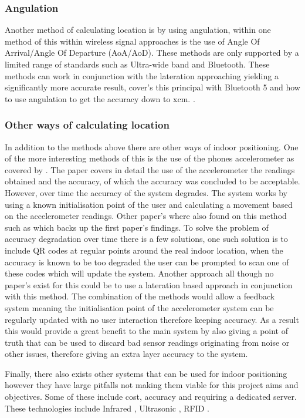 \subsubsection{Angulation}
Another method of calculating location is by using angulation, within one method of this within wireless signal approaches is the use of Angle Of Arrival/Angle Of Departure (AoA/AoD). These methods are only supported by a limited range of standards such as Ultra-wide band and Bluetooth. These methods can work in conjunction with the lateration approaching yielding a significantly more accurate result, \citetemp cover's this principal with Bluetooth 5 and how to use angulation to get the accuracy down to xcm. .

\subsubsection{Other ways of calculating location}
In addition to the methods above there are other ways of indoor positioning. One of the more interesting methods of this is the use of the phones accelerometer as covered by \citetemp. The paper covers in detail the use of the accelerometer the readings obtained and the accuracy, of which the accuracy was concluded to be acceptable. However, over time the accuracy of the system degrades. The system works by using a known initialisation point of the user and calculating a movement based on the accelerometer readings. Other paper's where also found on this method such as \citetemp which backs up the first paper's findings. To solve the problem of accuracy degradation over time there is a few solutions, one such solution is to include QR codes at regular points around the real indoor location, when the accuracy is known to be too degraded the user can be prompted to scan one of these codes which will update the system. Another approach all though no paper's exist for this could be to use a lateration based approach in conjunction with this method. The combination of the methods would allow a feedback system meaning the initialisation point of the accelerometer system can be regularly updated with no user interaction therefore keeping accuracy. As a result this would provide a great benefit to the main system by also giving a point of truth that can be used to discard bad sensor readings originating from noise or other issues, therefore giving an extra layer accuracy to the system.


Finally, there also exists other systems that can be used for indoor positioning however they have large pitfalls not making them viable for this project aims and objectives. Some of these include cost, accuracy and requiring a dedicated server. These technologies include Infrared \citetemp, Ultrasonic \citetemp, RFID \citetemp. 
